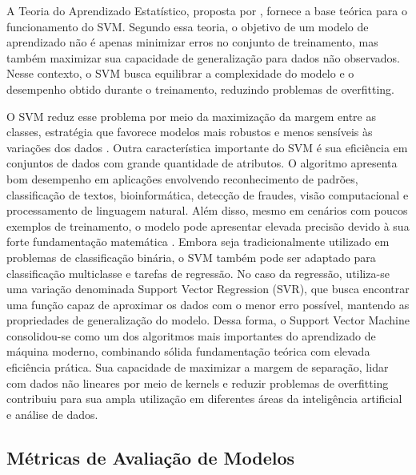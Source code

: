 \documentclass[
    12pt,                %
    openright,           %
    oneside,             %
    a4paper,             %
    english,             %
    brazil               %
]{abntex2}
\begin{document}
A Teoria do Aprendizado Estatístico, proposta por , fornece a base teórica para o funcionamento do SVM. Segundo essa teoria, o objetivo de um modelo de aprendizado não é apenas minimizar erros no conjunto de treinamento, mas também maximizar sua capacidade de generalização para dados não observados. Nesse contexto, o SVM busca equilibrar a complexidade do modelo e o desempenho obtido durante o treinamento, reduzindo problemas de overfitting.

O SVM reduz esse problema por meio da maximização da margem entre as classes, estratégia que favorece modelos mais robustos e menos sensíveis às variações dos dados \cite{Vapnik1998}.
Outra característica importante do SVM é sua eficiência em conjuntos de dados com grande quantidade de atributos. O algoritmo apresenta bom desempenho em aplicações envolvendo reconhecimento de padrões, classificação de textos, bioinformática, detecção de fraudes, visão computacional e processamento de linguagem natural. Além disso, mesmo em cenários com poucos exemplos de treinamento, o modelo pode apresentar elevada precisão devido à sua forte fundamentação matemática \cite{Cortes1995}.
Embora seja tradicionalmente utilizado em problemas de classificação binária, o SVM também pode ser adaptado para classificação multiclasse e tarefas de regressão. No caso da regressão, utiliza-se uma variação denominada Support Vector Regression (SVR), que busca encontrar uma função capaz de aproximar os dados com o menor erro possível, mantendo as propriedades de generalização do modelo.
Dessa forma, o Support Vector Machine consolidou-se como um dos algoritmos mais importantes do aprendizado de máquina moderno, combinando sólida fundamentação teórica com elevada eficiência prática. Sua capacidade de maximizar a margem de separação, lidar com dados não lineares por meio de kernels e reduzir problemas de overfitting contribuiu para sua ampla utilização em diferentes áreas da inteligência artificial e análise de dados.


\subsection{Métricas de Avaliação de Modelos}
\end{document}
